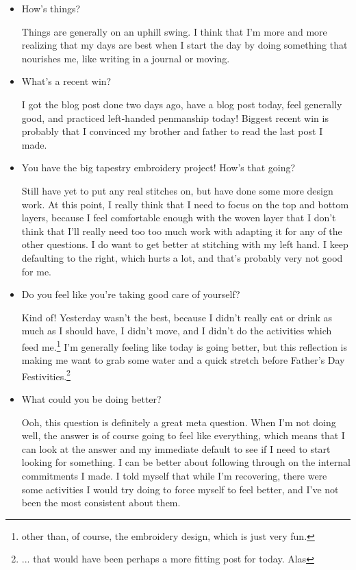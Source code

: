 \documentclass[12pt]{article}
\renewcommand{\,}{\textsuperscript{,}}
\begin{document}
\begin{itemize}  
\item How's things?

Things are generally on an uphill swing. I think that I'm more and more realizing that my days are best when I start the day by doing something that nourishes me, like writing in a journal or moving.

\item What's a recent win?

I got the blog post done two days ago, have a blog post today, feel generally good, and practiced left-handed penmanship today!  
Biggest recent win is probably that I convinced my brother and father to read the last post I made.

\item You have the big tapestry embroidery project! How's that going?

Still have yet to put any real stitches on, but have done some more design work. At this point, I really think that I need to focus on the top and bottom layers, because I feel comfortable enough with the woven layer that I don't think that I'll really need too too much work with adapting it for any of the other questions.  
I do want to get better at stitching with my left hand. I keep defaulting to the right, which hurts a lot, and that's probably very not good for me.

\item Do you feel like you're taking good care of yourself?

Kind of! Yesterday wasn't the best, because I didn't really eat or drink as much as I should have, I didn't move, and I didn't do the activities which feed me.\footnote{other than, of course, the embroidery design, which is just very fun.}  
I'm generally feeling like today is going better, but this reflection is making me want to grab some water and a quick stretch before Father's Day Festivities.\footnote{... that would have been perhaps a more fitting post for today. Alas}

\item What could you be doing better?

Ooh, this question is definitely a great meta question. When I'm not doing well, the answer is of course going to feel like everything, which means that I can look at the answer and my immediate default to see if I need to start looking for something.  
I can be better about following through on the internal commitments I made.  
I told myself that while I'm recovering, there were some activities I would try doing to force myself to feel better, and I've not been the most consistent about them.


\end{itemize}
\end{document}
